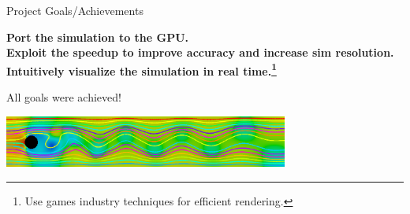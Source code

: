 \begin{frame}{Project Goals/Achievements}
    \begin{center}
        {
        \LARGE
        \textbf{Port the simulation to the GPU.}\\
        \vspace{1em}
        \textbf{Exploit the speedup to improve accuracy and increase sim resolution.}\\
        \vspace{1em}
        \textbf{Intuitively visualize the simulation in real time.\footnote{Use games industry techniques for efficient rendering.}}
        }
        
        
        \vfill\null
        {\Large All goals were achieved!}
        
        \vfill\null
        
        \includegraphics[width=0.7\textwidth]{Presentation/images/viz_particles.png}
    \end{center}
\end{frame}


